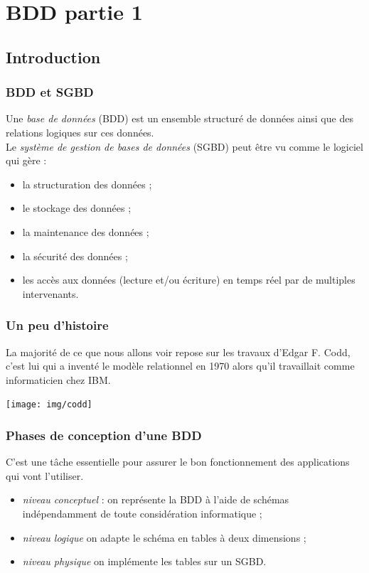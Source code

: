 \documentclass[10pt,firamath,cours]{nsi}
\begin{document}
\chapter{BDD partie 1}
\section{Introduction}
\subsection{BDD et SGBD}
	Une \textit{base de données} (BDD) est un ensemble structuré de données ainsi que des relations logiques sur ces données.\\

    Le \textit{système de gestion de bases de données} (SGBD) peut être vu comme le logiciel qui gère :
    \begin{itemize}
    	\item	la structuration des données ;
    	\item	le stockage des données ;
        \item 	la maintenance des données ;
        \item 	la sécurité des données ;
        \item 	les accès aux données (lecture et/ou écriture) en temps réel par de multiples intervenants.
    \end{itemize}


\subsection{Un peu d'histoire}
	La majorité de ce que nous allons voir repose sur les travaux d'Edgar F. Codd, c'est lui qui a inventé le modèle relationnel en 1970 alors qu'il travaillait comme informaticien chez IBM.
    \begin{center}
        \texttt{[image: img/codd]}
    \end{center}


\subsection{Phases de conception d'une BDD}
	C'est une tâche essentielle pour assurer le bon fonctionnement des applications qui vont l'utiliser.
    \begin{itemize}
    	\item	\textit{niveau conceptuel} : on représente la BDD à l'aide de schémas indépendamment de toute considération informatique ;
    	\item	\textit{niveau logique} on adapte le schéma en tables à deux dimensions ;
        \item	\textit{niveau physique} on implémente les tables sur un SGBD.
    \end{itemize}
\end{document}
